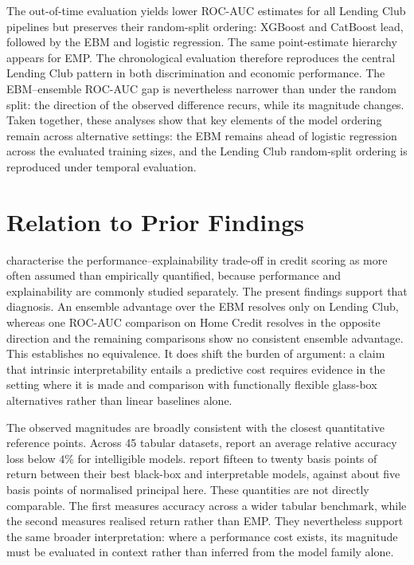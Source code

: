 The out-of-time evaluation yields lower ROC-AUC estimates for all Lending Club
pipelines but preserves their random-split ordering: XGBoost and CatBoost lead,
followed by the EBM and logistic regression. The same point-estimate hierarchy
appears for EMP. The chronological evaluation therefore reproduces the central
Lending Club pattern in both discrimination and economic performance. The
EBM--ensemble ROC-AUC gap is nevertheless narrower than under the random split:
the direction of the observed difference recurs, while its magnitude changes.
Taken together, these analyses show that key elements of the model ordering remain across alternative settings: the EBM remains ahead of logistic regression across
the evaluated training sizes, and the Lending Club random-split ordering is
reproduced under temporal evaluation.


\section{Relation to Prior Findings}

\citet{bahloolPerformanceFairnessExplainability2026} characterise the
performance--explainability trade-off in credit scoring as more often assumed than
empirically quantified, because performance and explainability are commonly studied
separately. The present findings support that diagnosis. An ensemble advantage over the EBM resolves only on Lending Club, whereas
one ROC-AUC comparison on Home Credit resolves in the opposite direction and the
remaining comparisons show no consistent ensemble advantage. This establishes no equivalence. It does shift the burden of argument: a claim that
intrinsic interpretability entails a predictive cost requires evidence in the setting
where it is made and comparison with functionally flexible glass-box alternatives
rather than linear baselines alone.

The observed magnitudes are broadly consistent with the closest quantitative reference
points. Across 45 tabular datasets,
\citet{amekoeExploringAccuracyInterpretability2024b} report an average relative
accuracy loss below $4\%$ for intelligible models.
\citet{dessainCostExplainabilityAI2023} report fifteen to twenty basis points of
return between their best black-box and interpretable models, against about five
basis points of normalised principal here. These quantities are not directly
comparable. The first measures accuracy across a wider tabular benchmark, while
the second measures realised return rather than EMP. They nevertheless support the
same broader interpretation: where a performance cost exists, its magnitude must be
evaluated in context rather than inferred from the model family alone.

